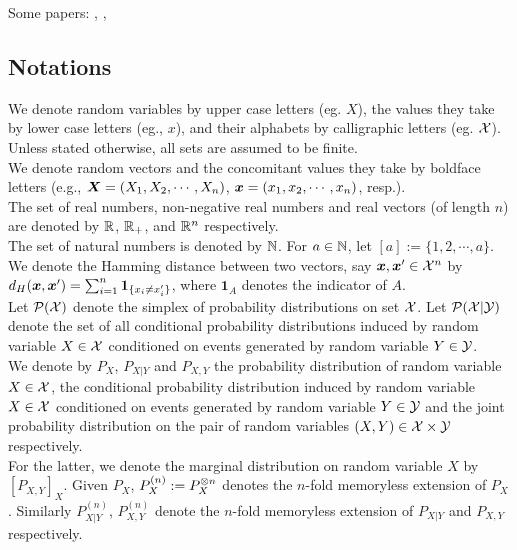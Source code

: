 Some papers: \cite{winterCommitmentCapacityDiscrete2003b},  \cite{evenRandomizedProtocolSigning1985}, \cite{mamindlapallyCommitmentCapacityCost2021}

\subsection{Notations}
\label{sec:notations}

We denote random variables by upper case letters (eg. $X$), the values they take by lower case letters (eg., $x$), and their alphabets by calligraphic letters (eg. $\mathcal{X}$). 
\\
Unless stated otherwise, all sets are assumed to be finite. 
\\
We denote random vectors and the concomitant values they take by boldface letters (e.g., $\boldsymbol{X} = (X_1,X_2,\cdots,X_n)$, $\boldsymbol{x}=(x_1,x_2,\cdots,x_n)$, resp.). 
\\
The set of real numbers, non-negative real numbers and real vectors (of length $n$) are denoted by $\mathbb{R}$, $\mathbb{R}_+$, and $\mathbb{R}^n$ respectively. 
\\
The set of natural numbers is denoted by $\mathbb{N}$. For $a\in\mathbb{N}$, let $[a]:=\{1,2,\cdots, a\}$. 
\\
We denote the Hamming distance between two vectors, say $\boldsymbol{x},\boldsymbol{x}'\in\mathcal{X}^n$ by $d_H(\boldsymbol{x},\boldsymbol{x}')
=\sum_{i=1}^n \mathbf{1}_{\{x_i\neq x'_i\}}$, where $\mathbf{1}_{A}$  denotes the indicator of $A$.
%
\\
Let $\mathcal{P}(\mathcal{X})$ denote the simplex of probability distributions on set $\mathcal{X}$. Let $\mathcal{P}(\mathcal{X}|\mathcal{Y})$ denote the set of all conditional probability distributions induced by random variable $X\in\mathcal{X}$ conditioned on events generated by random variable $Y\in\mathcal{Y}$. 
\\
We denote by $P_X$, $P_{X|Y}$ and $P_{X,Y}$ the probability distribution of random variable $X\in\mathcal{X}$, the conditional probability distribution induced by random variable $X\in\mathcal{X}$ conditioned on  events generated by random variable $Y\in\mathcal{Y}$ and the joint probability distribution  on the pair of random variables $(X,Y)\in\mathcal{X}\times \mathcal{Y}$ respectively.
\\ 
For the latter, we denote the marginal distribution on random variable $X$ by $[P_{X,Y}]_X$. Given $P_{X}$, $P_{X}^{(n)} := P_X ^{\otimes n}$ denotes the $n$-fold memoryless extension of $P_X$. 
Similarly $P_{X|Y}^{(n)}$, $P_{X,Y}^{(n)}$ denote the $n$-fold memoryless extension of $P_{X|Y}$ and $P_{X,Y}$ respectively. 
